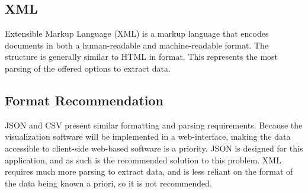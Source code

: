 \documentclass[onecolumn, draftclsnofoot,10pt, compsoc]{IEEEtran}
\begin{document}
		\subsection{XML}
			\noindent
			Extensible Markup Language (XML) is a markup language that encodes documents in both a human-readable and machine-readable format.
			The structure is generally similar to HTML in format.
			This represents the most parsing of the offered options to extract data.

		\subsection{Format Recommendation}
			\noindent
			JSON and CSV present similar formatting and parsing requirements.
			Because the visualization software will be implemented in a web-interface, making the data accessible to client-side web-based software is a priority.
			JSON is designed for this application, and as such is the recommended solution to this problem.
			XML requires much more parsing to extract data, and is less reliant on the format of the data being known a priori, so it is not recommended.
			
%				
%		
%			
		
\end{document}
